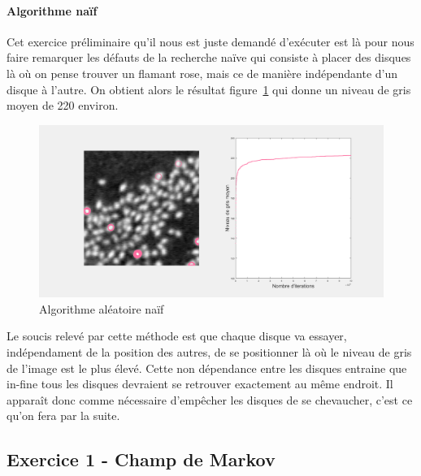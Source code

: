 \documentclass{article}
\begin{document}
\paragraph{Algorithme naïf}
Cet exercice préliminaire qu'il nous est juste demandé d'exécuter est là pour nous faire remarquer les défauts de la recherche naïve qui consiste à placer des disques là où on pense trouver un flamant rose, mais ce de manière indépendante d'un disque à l'autre. On obtient alors le résultat figure~\ref{6-naif} qui donne un niveau de gris moyen de 220 environ.
\begin{figure}[!ht]
    \centering
    \includegraphics[width=\linewidth]{images/6-naif.png}
    \caption{Algorithme aléatoire naïf}
    \label{6-naif}
\end{figure}

Le soucis relevé par cette méthode est que chaque disque va essayer, indépendament de la position des autres, de se positionner là où le niveau de gris de l'image est le plus élevé. Cette non dépendance entre les disques entraine que in-fine tous les disques devraient se retrouver exactement au même endroit. Il apparaît donc comme nécessaire d'empêcher les disques de se chevaucher, c'est ce qu'on fera par la suite.

\subsection{Exercice 1 - Champ de Markov}
\end{document}
